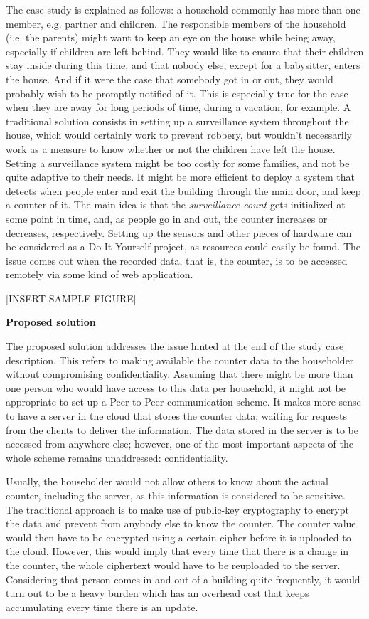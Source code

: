 The case study is explained as follows: a household commonly has more than one member, e.g. partner and children. The responsible members of the household (i.e. the parents) might want to keep an eye on the house while being away, especially if children are left behind. They would like to ensure that their children stay inside during this time, and that nobody else, except for a babysitter, enters the house. And if it were the case that somebody got in or out, they would probably wish to be promptly notified of it. This is especially true for the case when they are away for long periods of time, during a vacation, for example. A traditional solution consists in setting up a surveillance system throughout the house, which would certainly work to prevent robbery, but wouldn't necessarily work as a measure to know whether or not the children have left the house. Setting a surveillance system might be too costly for some families, and not be quite adaptive to their needs. It might be more efficient to deploy a system that detects when people enter and exit the building through the main door, and keep a counter of it. The main idea is that the \textit{surveillance count} gets initialized at some point in time, and, as people go in and out, the counter increases or decreases, respectively. Setting up the sensors and other pieces of hardware can be considered as a Do-It-Yourself project, as resources could easily be found. The issue comes out when the recorded data, that is, the counter, is to be accessed remotely via some kind of web application. 

[INSERT SAMPLE FIGURE]

\textbf{Proposed solution}

The proposed solution addresses the issue hinted at the end of the study case description. This refers to making available the counter data to the householder without compromising confidentiality. Assuming that there might be more than one person who would have access to this data per household, it might not be appropriate to set up a Peer to Peer communication scheme. It makes more sense to have a server in the cloud that stores the counter data, waiting for requests from the clients to deliver the information. The data stored in the server is to be accessed from anywhere else; however, one of the most important aspects of the whole scheme remains unaddressed: confidentiality.

Usually, the householder would not allow others to know about the actual counter, including the server, as this information is considered to be sensitive. The traditional approach is to make use of public-key cryptography to encrypt the data and prevent from anybody else to know the counter. The counter value would then have to be encrypted using a certain cipher before it is uploaded to the cloud. However, this would imply that every time that there is a change in the counter, the whole ciphertext would have to be reuploaded to the server. Considering that person comes in and out of a building quite frequently, it would turn out to be a heavy burden which has an overhead cost that keeps accumulating every time there is an update. 

